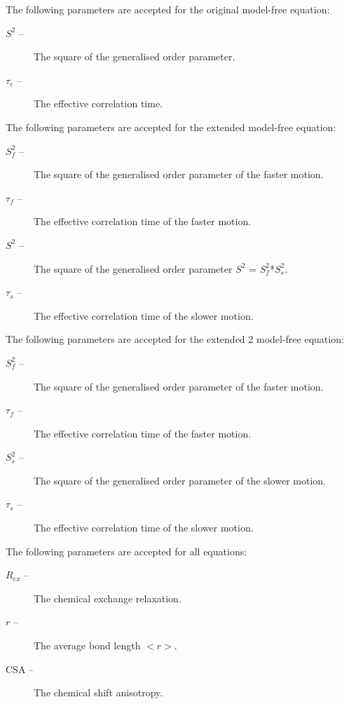 The following parameters are accepted for the original model-free equation:
\begin{description}
\item[    $S^2$ --]      The square of the generalised order parameter. 
\item[    $\tau_e$ --]      The effective correlation time. 
\end{description}
The following parameters are accepted for the extended model-free equation:
\begin{description}
\item[    $S^2_f$ --]     The square of the generalised order parameter  of the faster motion.
\item[    $\tau_f$ --]      The effective correlation time  of the faster motion.
\item[    $S^2$ --]      The square of the generalised order parameter  $S^2$ = $S^2_f$*$S^2_s$.
\item[    $\tau_s$ --]      The effective correlation time  of the slower motion.
\end{description}
The following parameters are accepted for the extended 2 model-free equation:
\begin{description}
\item[    $S^2_f$ --]     The square of the generalised order parameter  of the faster motion.
\item[    $\tau_f$ --]      The effective correlation time  of the faster motion.
\item[    $S^2_s$ --]     The square of the generalised order parameter  of the slower motion.
\item[    $\tau_s$ --]      The effective correlation time  of the slower motion.
\end{description}
The following parameters are accepted for all equations:
\begin{description}
\item[    $R_{ex}$ --]     The chemical exchange  relaxation. 
\item[    $r$ --]       The average bond length  $<$$r$$>$.
\item[    CSA --]     The chemical shift anisotropy.
\end{description}


